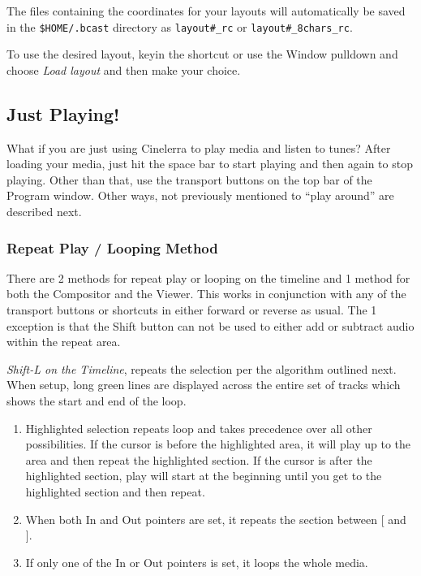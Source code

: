 The files containing the coordinates for your layouts will automatically be saved in the \texttt{\$HOME/.bcast} directory as \texttt{layout\#\_rc} or \texttt{layout\#\_8chars\_rc}.

To use the desired layout, keyin the shortcut or use the Window pulldown and choose \emph{Load layout} and then make your choice. 

\subsection{Just Playing!}%
\label{sub:just_playing_}
What if you are just using Cinelerra to play media and listen to tunes? 
After loading your media, just hit the space bar to start playing and then again to stop playing.  
Other than that, use the transport buttons on the top bar of the Program window.  
Other ways, not previously mentioned to “play around” are described next. 

\subsubsection*{Repeat Play / Looping Method}%
\label{ssub:repeat_play_looping_method}

There are 2 methods for repeat play or looping on the timeline and 1 method for both the Compositor and the Viewer.  This works in conjunction with any of the transport buttons or shortcuts in either forward or reverse as usual.  The 1 exception is that the Shift button can not be used to either add or subtract audio within the repeat area.


\emph{Shift-L on the Timeline}, repeats the selection per the algorithm outlined next.  
When setup, long green lines are displayed across the entire set of tracks which shows the start and end of the loop.
\begin{enumerate}
    \item  Highlighted selection repeats loop and takes precedence over all other possibilities.  
        If the cursor is before the highlighted area, it will play up to the area and then repeat the highlighted section.  
        If the cursor is after the highlighted section, play will start at the beginning until you get to the
        highlighted section and then repeat.
    \item  When both In and Out pointers are set, it repeats the section between [ and ].
    \item  If only one of the In or Out pointers is set, it loops the whole media.
\end{enumerate}

